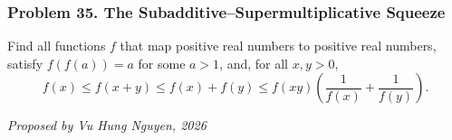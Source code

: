\subsubsection*{Problem 35. The Subadditive--Supermultiplicative Squeeze}

\begin{exercisebox}[hard]

Find all functions $f$ that map positive real numbers to positive real
numbers, satisfy $f(f(a))=a$ for some $a>1$, and, for all $x,y>0$,
\[
\boxed{
f(x)\leq f(x+y)\leq f(x)+f(y)
\leq f(xy)\left(\frac1{f(x)}+\frac1{f(y)}\right).
}
\]

\begin{flushright}
\textit{Proposed by Vu Hung Nguyen, 2026}
\end{flushright}


\end{exercisebox}
